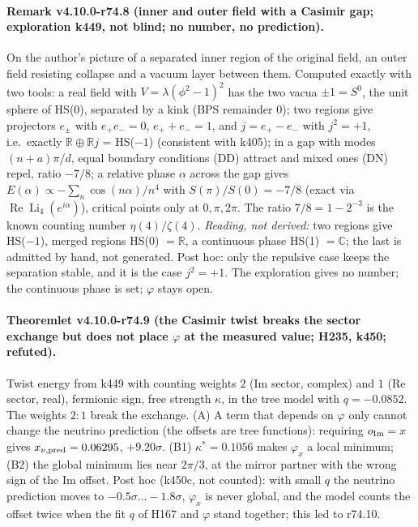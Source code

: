 \paragraph{Remark v4.10.0-r74.8 (inner and outer field with a Casimir gap; exploration k449, not blind; no number, no prediction).}
On the author's picture of a separated inner region of the original field, an outer field resisting collapse and a vacuum layer between them.
Computed exactly with two tools: a real field with \(V=\lambda(\phi^2-1)^2\) has the two vacua \(\pm1=S^0\), the unit sphere of HS(0), separated by
a kink (BPS remainder \(0\)); two regions give projectors \(e_\pm\) with \(e_+e_-=0\), \(e_++e_-=1\), and \(j=e_+-e_-\) with \(j^2=+1\), i.e.\ exactly
\(\mathbb R\oplus\mathbb Rj\) = HS(\(-1\)) (consistent with k405); in a gap with modes \((n+a)\pi/d\), equal boundary conditions (DD) attract and mixed
ones (DN) repel, ratio \(-7/8\); a relative phase \(\alpha\) across the gap gives \(E(\alpha)\propto-\sum_n\cos(n\alpha)/n^4\) with \(S(\pi)/S(0)=-7/8\)
(exact via \(\operatorname{Re}\operatorname{Li}_4(e^{i\alpha})\)), critical points only at \(0,\pi,2\pi\).  The ratio \(7/8=1-2^{-3}\) is the known
counting number \(\eta(4)/\zeta(4)\).  \emph{Reading, not derived:} two regions give HS(\(-1\)), merged regions HS(0) \(=\mathbb R\), a continuous phase
HS(1) \(=\mathbb C\); the last is admitted by hand, not generated.  Post hoc: only the repulsive case keeps the separation stable, and it is
the case \(j^2=+1\).  The exploration gives no number; the continuous phase is set; \(\varphi\) stays open.

\paragraph{Theoremlet v4.10.0-r74.9 (the Casimir twist breaks the sector exchange but does not place \(\varphi\) at the measured value; H235, k450; refuted).}
Twist energy from k449 with counting weights \(2\) (Im sector, complex) and \(1\) (Re sector, real), fermionic sign, free strength \(\kappa\), in
the tree model with \(q=-0.0852\).  The weights \(2:1\) break the exchange.  (A) A term that depends on \(\varphi\) only cannot change the neutrino
prediction (the offsets are tree functions): requiring \(o_{\rm Im}=x\) gives \(x_{\nu,\rm pred}=0.06295\), \(+9.20\sigma\).  (B1) \(\kappa^*=0.1056\) makes
\(\varphi_x\) a local minimum; (B2) the global minimum lies near \(2\pi/3\), at the mirror partner with the wrong sign of the Im offset.  Post hoc
(k450c, not counted): with small \(q\) the neutrino prediction moves to \(-0.5\sigma\ldots-1.8\sigma\), \(\varphi_x\) is never global, and the model
counts the offset twice when the fit \(q\) of H167 and \(\varphi\) stand together; this led to r74.10.

